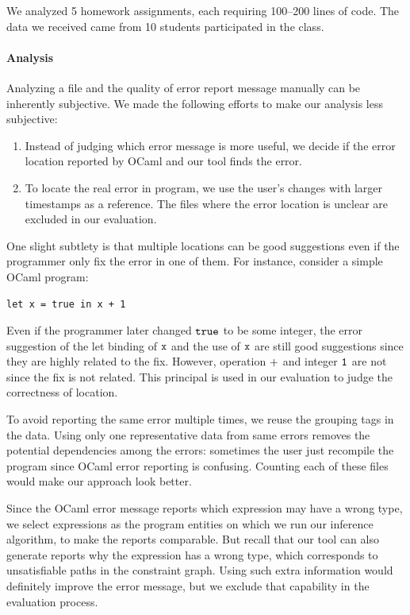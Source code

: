 We analyzed 5 homework assignments, each requiring 100--200 lines of
code. The data we received came from 10 students participated in the
class.

\paragraph{Analysis}

Analyzing a file and the quality of error report message manually can
be inherently subjective. We made the following efforts to make our
analysis less subjective:
\begin{enumerate}
\item Instead of judging which error message is more useful, we decide
if the error location reported by OCaml and our tool finds the error.

\item To locate the real error in program, we use the user's changes
with larger timestamps as a reference. The files where the error
location is unclear are excluded in our evaluation.
\end{enumerate}

One slight subtlety is that multiple locations can be good suggestions
even if the programmer only fix the error in one of them. For
instance, consider a simple OCaml program:
\begin{lstlisting}
let x = true in x + 1
\end{lstlisting}

Even if the programmer later changed $\mathtt{true}$ to be some integer,
the error suggestion of the let binding of $\mathtt{x}$ and the use of
$\mathtt{x}$ are still good suggestions since they are highly related to
the fix. However, operation $\mathtt{+}$ and integer $\mathtt{1}$ are not
since the fix is not related. This principal is used in our evaluation
to judge the correctness of location.

To avoid reporting the same error multiple times, we reuse the
grouping tags in the data. Using only one representative data from
same errors removes the potential dependencies among the errors:
sometimes the user just recompile the program since OCaml error
reporting is confusing. Counting each of these files would make our
approach look better.

Since the OCaml error message reports which expression may have a wrong
type, we select expressions as the program entities on which we run our
inference algorithm, to make the reports comparable. But recall that
our tool can also generate reports why the expression has a wrong
type, which corresponds to unsatisfiable paths in the constraint
graph. Using such extra information would definitely improve the error
message, but we exclude that capability in the evaluation process.

